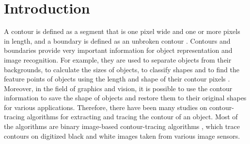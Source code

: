 \documentclass[sensors,article,accept,moreauthors,pdftex,10pt,a4paper]{mdpi}
\begin{document}

\section{Introduction}


A contour is defined as a segment that is one pixel wide and one or more pixels in length, and a boundary is defined as an unbroken contour \cite{Mcqueen2004Contour}. Contours and boundaries provide very important information for object representation and image recognition. For example, they are used to separate objects from their backgrounds, to calculate the sizes of objects, to classify shapes and to find the feature points of objects using the length and shape of their contour pixels \cite{Pratt????Digital,Gose1996Pattern}. Moreover, in the field of graphics and vision, it is possible to use the contour information to save the shape of objects and restore them to their original shapes for various applications. Therefore, there have been many studies on contour-tracing algorithms for extracting and tracing the contour of an object. Most of the algorithms are binary image-based contour-tracing algorithms \cite{Pitas2000Digital,Gose1996Pattern,Das1990Bivariate,Papert1973Uses,Cheong2006Improved,Mirante1982Radial,Pavlidis2012Algorithms}, which trace contours on digitized black and white images taken from various image sensors.
\end{document}
